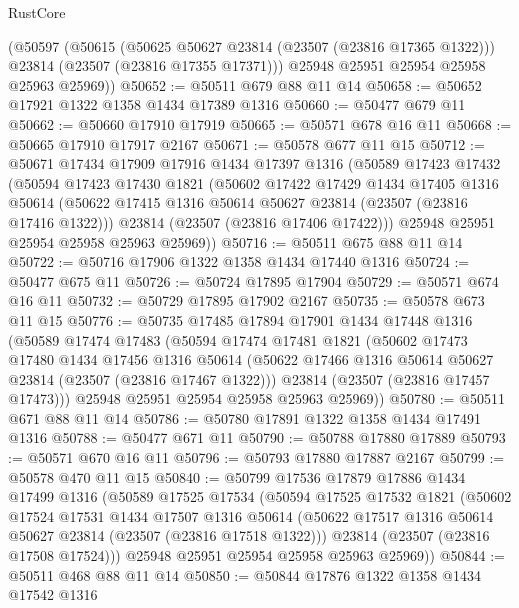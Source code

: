 \begin{lexlean}{RustCore}
\begin{coremodule}
      (@50597
        (@50615
          (@50625 @50627 @23814 (@23507 (@23816 @17365 @1322)))
          @23814
          (@23507 (@23816 @17355 @17371)))
        @25948
        @25951
        @25954
        @25958
        @25963
        @25969))
@50652 := @50511 @679 @88 @11 @14
@50658 := @50652 @17921 @1322 @1358 @1434 @17389 @1316
@50660 := @50477 @679 @11
@50662 := @50660 @17910 @17919
@50665 := @50571 @678 @16 @11
@50668 := @50665 @17910 @17917 @2167
@50671 := @50578 @677 @11 @15
@50712 := @50671
    @17434
    @17909
    @17916
    @1434
    @17397
    @1316
    (@50589
      @17423
      @17432
      (@50594
        @17423
        @17430
        @1821
        (@50602
          @17422
          @17429
          @1434
          @17405
          @1316
          @50614
          (@50622 @17415 @1316 @50614 @50627 @23814 (@23507 (@23816 @17416 @1322)))
          @23814
          (@23507 (@23816 @17406 @17422)))
        @25948
        @25951
        @25954
        @25958
        @25963
        @25969))
@50716 := @50511 @675 @88 @11 @14
@50722 := @50716 @17906 @1322 @1358 @1434 @17440 @1316
@50724 := @50477 @675 @11
@50726 := @50724 @17895 @17904
@50729 := @50571 @674 @16 @11
@50732 := @50729 @17895 @17902 @2167
@50735 := @50578 @673 @11 @15
@50776 := @50735
    @17485
    @17894
    @17901
    @1434
    @17448
    @1316
    (@50589
      @17474
      @17483
      (@50594
        @17474
        @17481
        @1821
        (@50602
          @17473
          @17480
          @1434
          @17456
          @1316
          @50614
          (@50622 @17466 @1316 @50614 @50627 @23814 (@23507 (@23816 @17467 @1322)))
          @23814
          (@23507 (@23816 @17457 @17473)))
        @25948
        @25951
        @25954
        @25958
        @25963
        @25969))
@50780 := @50511 @671 @88 @11 @14
@50786 := @50780 @17891 @1322 @1358 @1434 @17491 @1316
@50788 := @50477 @671 @11
@50790 := @50788 @17880 @17889
@50793 := @50571 @670 @16 @11
@50796 := @50793 @17880 @17887 @2167
@50799 := @50578 @470 @11 @15
@50840 := @50799
    @17536
    @17879
    @17886
    @1434
    @17499
    @1316
    (@50589
      @17525
      @17534
      (@50594
        @17525
        @17532
        @1821
        (@50602
          @17524
          @17531
          @1434
          @17507
          @1316
          @50614
          (@50622 @17517 @1316 @50614 @50627 @23814 (@23507 (@23816 @17518 @1322)))
          @23814
          (@23507 (@23816 @17508 @17524)))
        @25948
        @25951
        @25954
        @25958
        @25963
        @25969))
@50844 := @50511 @468 @88 @11 @14
@50850 := @50844 @17876 @1322 @1358 @1434 @17542 @1316

\end{coremodule}
\end{lexlean}
